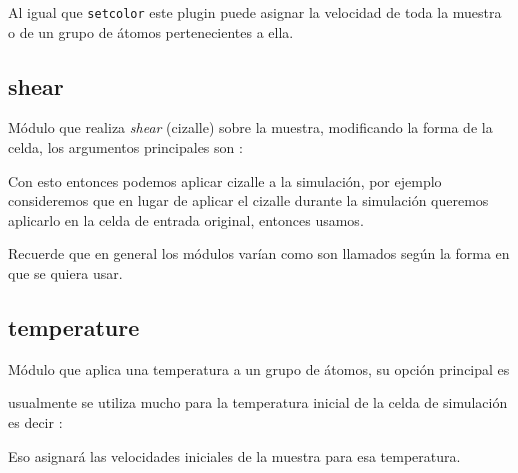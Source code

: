 
Al igual que \verb|setcolor| este plugin puede asignar la velocidad de toda la
muestra o de un grupo de \'atomos pertenecientes a ella.

\subsection{shear}
M\'odulo que realiza \textit{shear} (cizalle) sobre la muestra, modificando la
forma de la celda, los argumentos principales son :


Con esto entonces podemos aplicar cizalle a la simulaci\'on, por ejemplo
consideremos que en lugar de aplicar el cizalle durante la simulaci\'on queremos
aplicarlo en la celda de entrada original, entonces usamos.


Recuerde que en general los m\'odulos var\'ian como son llamados seg\'un la
forma en que se quiera usar.

\subsection{temperature}
M\'odulo que aplica una temperatura a un grupo de \'atomos, su opci\'on
principal es


usualmente se utiliza mucho para la temperatura inicial de la celda de
simulaci\'on es decir :


Eso asignar\'a las velocidades iniciales de la muestra para esa temperatura.

